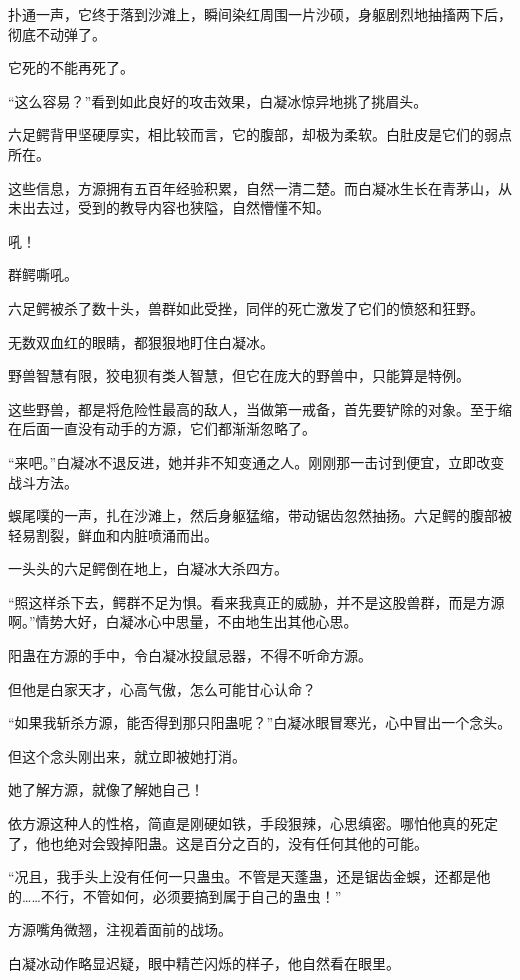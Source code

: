 \begin{this_body}
扑通一声，它终于落到沙滩上，瞬间染红周围一片沙硕，身躯剧烈地抽搐两下后，彻底不动弹了。

它死的不能再死了。

“这么容易？”看到如此良好的攻击效果，白凝冰惊异地挑了挑眉头。

六足鳄背甲坚硬厚实，相比较而言，它的腹部，却极为柔软。白肚皮是它们的弱点所在。

这些信息，方源拥有五百年经验积累，自然一清二楚。而白凝冰生长在青茅山，从未出去过，受到的教导内容也狭隘，自然懵懂不知。

吼！

群鳄嘶吼。

六足鳄被杀了数十头，兽群如此受挫，同伴的死亡激发了它们的愤怒和狂野。

无数双血红的眼睛，都狠狠地盯住白凝冰。

野兽智慧有限，狡电狈有类人智慧，但它在庞大的野兽中，只能算是特例。

这些野兽，都是将危险性最高的敌人，当做第一戒备，首先要铲除的对象。至于缩在后面一直没有动手的方源，它们都渐渐忽略了。

“来吧。”白凝冰不退反进，她并非不知变通之人。刚刚那一击讨到便宜，立即改变战斗方法。

蜈尾噗的一声，扎在沙滩上，然后身躯猛缩，带动锯齿忽然抽扬。六足鳄的腹部被轻易割裂，鲜血和内脏喷涌而出。

一头头的六足鳄倒在地上，白凝冰大杀四方。

“照这样杀下去，鳄群不足为惧。看来我真正的威胁，并不是这股兽群，而是方源啊。”情势大好，白凝冰心中思量，不由地生出其他心思。

阳蛊在方源的手中，令白凝冰投鼠忌器，不得不听命方源。

但他是白家天才，心高气傲，怎么可能甘心认命？

“如果我斩杀方源，能否得到那只阳蛊呢？”白凝冰眼冒寒光，心中冒出一个念头。

但这个念头刚出来，就立即被她打消。

她了解方源，就像了解她自己！

依方源这种人的性格，简直是刚硬如铁，手段狠辣，心思缜密。哪怕他真的死定了，他也绝对会毁掉阳蛊。这是百分之百的，没有任何其他的可能。

“况且，我手头上没有任何一只蛊虫。不管是天蓬蛊，还是锯齿金蜈，还都是他的……不行，不管如何，必须要搞到属于自己的蛊虫！”

方源嘴角微翘，注视着面前的战场。

白凝冰动作略显迟疑，眼中精芒闪烁的样子，他自然看在眼里。


\end{this_body}
